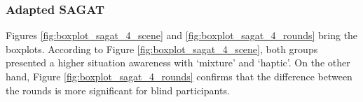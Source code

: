 \subsubsection{Adapted SAGAT}
\label{subsubsec:results_adapted_sagat_2}


%

%

Figures \ref{fig:boxplot_sagat_4_scene} and \ref{fig:boxplot_sagat_4_rounds} bring the boxplots. According to Figure \ref{fig:boxplot_sagat_4_scene}, both groups presented a higher situation awareness with ‘mixture’ and ‘haptic’. On the other hand, Figure \ref{fig:boxplot_sagat_4_rounds} confirms that the difference between the rounds is more significant for blind participants. 

